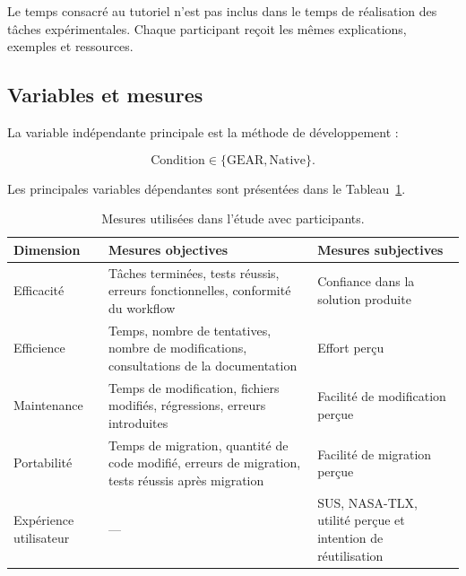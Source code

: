 Le temps consacré au tutoriel n'est pas inclus dans le temps de
réalisation des tâches expérimentales. Chaque participant reçoit les
mêmes explications, exemples et ressources.


\subsection{Variables et mesures}
\label{subsec:variables-mesures}

La variable indépendante principale est la méthode de développement :

\begin{equation}
\text{Condition}
\in
\{\text{GEAR},\text{Native}\}.
\end{equation}

Les principales variables dépendantes sont présentées dans le
Tableau~\ref{tab:mesures-participants}.

\begin{table}[t]
    \centering
    \caption{Mesures utilisées dans l'étude avec participants.}
    \label{tab:mesures-participants}
    \begin{tabularx}{\textwidth}{@{}l>{\raggedright\arraybackslash}X>{\raggedright\arraybackslash}X@{}}
        \toprule
        \textbf{Dimension}
        & \textbf{Mesures objectives}
        & \textbf{Mesures subjectives} \\
        \midrule
        Efficacité
            & Tâches terminées, tests réussis, erreurs fonctionnelles,
              conformité du workflow
            & Confiance dans la solution produite \\
        Efficience
            & Temps, nombre de tentatives, nombre de modifications,
              consultations de la documentation
            & Effort perçu \\
        Maintenance
            & Temps de modification, fichiers modifiés, régressions,
              erreurs introduites
            & Facilité de modification perçue \\
        Portabilité
            & Temps de migration, quantité de code modifié, erreurs de
              migration, tests réussis après migration
            & Facilité de migration perçue \\
        Expérience utilisateur
            & --- 
            & SUS, NASA-TLX, utilité perçue et intention de
              réutilisation \\
        \bottomrule
    \end{tabularx}
\end{table}


